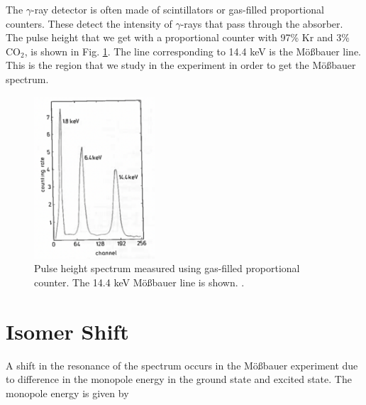 \documentclass[a4paper]{report}
\numberwithin{equation}{section}
\begin{document}
The $\gamma$-ray detector is often made of scintillators or gas-filled proportional counters. These detect the intensity of $\gamma$-rays that pass through the absorber. The pulse height that we get with a proportional counter with 97\% Kr and 3\% CO$_2$, is shown in Fig. \ref{fig:pulse-height}. The line corresponding to 14.4 keV is the M\"o{\ss}bauer line. This is the region that we study in the experiment in order to get the M\"o{\ss}bauer spectrum. 

\begin{figure}[htpb]
    \centering
    \includegraphics[width=0.4\textwidth]{pulse-height}
    \caption{Pulse height spectrum measured using gas-filled proportional counter. The 14.4 keV M\"o{\ss}bauer line is shown. \cite{Schatz1996}.}
    \label{fig:pulse-height}
\end{figure}


\section{Isomer Shift}

A shift in the resonance of the spectrum occurs in the M\"o{\ss}bauer experiment due to difference in the monopole energy in the ground state and excited state. The monopole energy is given by
\end{document}
